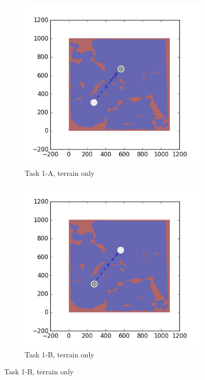\documentclass{tamuccthesis}
\begin{document}
\begin{figure}[H]
    \centering
    \begin{subfigure}[b]{0.4\textwidth}
        \centering
        \includegraphics[width=\textwidth,trim={3cm 3cm 3cm 3cm},clip]{EXP3RG_PathAa_-1_-1_0_0.png}
        \caption{{\small Task 1-A, terrain only}}
        \label{fig:Path_1-A_terrain_only}
    \end{subfigure}
    \hfill
    \begin{subfigure}[b]{0.4\textwidth}  
        \centering 
        \includegraphics[width=\textwidth,trim={3cm 3cm 3cm 3cm},clip]{EXP3RG_PathAb_-1_-1_0_0.png}
        \caption{{\small Task 1-B, terrain only}}   
        \label{fig:Path_1-B_terrain_only}
    \end{subfigure}
    

\end{figure}
\end{document}
